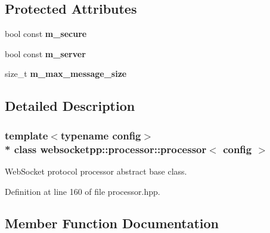 \subsection*{Protected Attributes}
\begin{DoxyCompactItemize}
\item 
bool const {\bfseries m\+\_\+secure}\hypertarget{classwebsocketpp_1_1processor_1_1processor_aebab411b1ca4d8ab32ee8c13afcf9274}{}\label{classwebsocketpp_1_1processor_1_1processor_aebab411b1ca4d8ab32ee8c13afcf9274}

\item 
bool const {\bfseries m\+\_\+server}\hypertarget{classwebsocketpp_1_1processor_1_1processor_a584edc3698f98e6eb85ab280f491ac9d}{}\label{classwebsocketpp_1_1processor_1_1processor_a584edc3698f98e6eb85ab280f491ac9d}

\item 
size\+\_\+t {\bfseries m\+\_\+max\+\_\+message\+\_\+size}\hypertarget{classwebsocketpp_1_1processor_1_1processor_a74984af956fccae7e045743cf8ac23b4}{}\label{classwebsocketpp_1_1processor_1_1processor_a74984af956fccae7e045743cf8ac23b4}

\end{DoxyCompactItemize}


\subsection{Detailed Description}
\subsubsection*{template$<$typename config$>$\\*
class websocketpp\+::processor\+::processor$<$ config $>$}

Web\+Socket protocol processor abstract base class. 

Definition at line 160 of file processor.\+hpp.



\subsection{Member Function Documentation}

